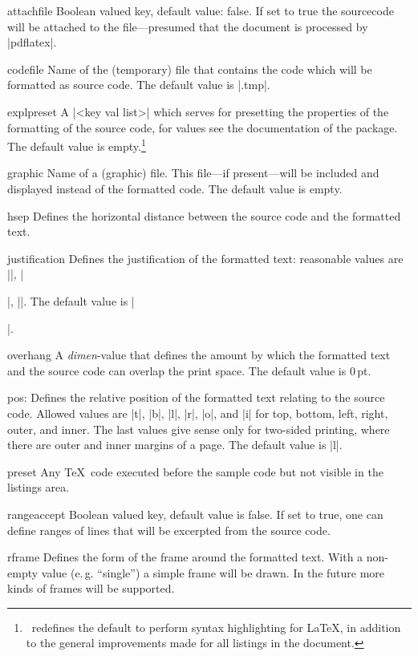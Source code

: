 \documentclass{ltxguidex}
\newcommand{\ltx}{\ltxclass{ltxguidex}}
\begin{document}
\begin{options}
	\item[attachfile] Boolean valued key, default value: false. If set to
	true the sourcecode will be attached to the 
	file---presumed that the document is processed by |pdflatex|.
	\item[codefile] Name of the (temporary) file that contains the code
	which will be formatted as source code. The default value is |\jobname.tmp|.
	\item[explpreset] A |<key val list>| which serves for presetting the
	properties of the formatting of the source code, for values see the
	documentation of the  package. The default value is
	empty.\footnote{\ltx\ redefines the default to perform syntax
	highlighting for \LaTeX, in addition to the general improvements
	made for all listings in the document.}
	\item[graphic] Name of a (graphic) file. This file---if present---will
	be included and displayed instead of the formatted code. The default value is empty.
	\item[hsep] Defines the horizontal distance between the source code and the
	formatted text.
	\item[justification] Defines the justification of the formatted text:
	reasonable values are |\raggedleft|, |\raggedright|, |\centering|. The
	default value is |\raggedright|.
	\item[overhang] A \textit{dimen}-value that defines the amount by which
	the formatted text and the source code can overlap the print space. The
	default value is 0\,pt.
	\item[pos:] Defines the relative position of the formatted text
	relating to the source code. Allowed values are |t|, |b|, |l|, |r|,
	|o|, and |i| for top, bottom, left, right, outer, and inner. The last
	values give sense only for two-sided printing, where there are outer
	and inner margins of a page. The default value is |l|.
	\item[preset] Any \TeX\ code executed before the sample code but
	not visible in the listings area.
	\item[rangeaccept] Boolean valued key, default value is false. If set
	to  true, one can define ranges of lines that will be excerpted from
	the source code.
	\item[rframe] Defines the form of the frame around the formatted
	text. With a non-empty value (e.\,g. ``single'') a simple frame
	will be drawn. In the future more kinds of frames will be supported.

\end{options}
\end{document}
